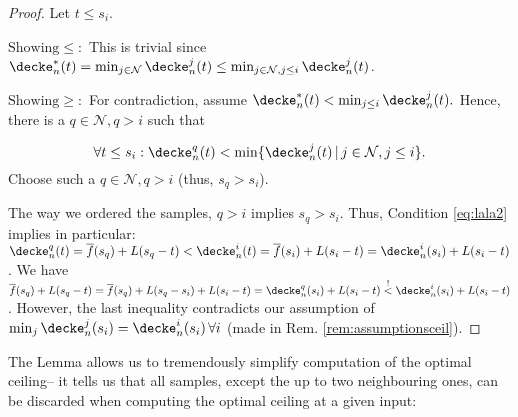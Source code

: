 \begin{lem}
\begin{proof}
Let $t \leq s_i$. 

$\text{Showing} \leq:$ This is trivial since $\decke_n^*(t) = \min_{j \in \mathcal N} \decke_n^j(t) \leq \min_{j \in \mathcal N, j \leq i}\decke_n^j(t)$. 


$\text{Showing} \geq:$ For contradiction, assume $\decke_n^* ( t) < \min_{j\leq i} \decke_n^j(t).$ 
Hence, there is a $q \in \mathcal N, q > i$ such that 

\begin{equation}
\label{eq:lala2}
\forall t \leq s_i: \decke_n^q(t) < \min\{  \decke_n^j (t) \,\vert \, j \in \mathcal N, j \leq i\}.
\end{equation}
%
Choose such a $q \in \mathcal N , q > i$ (thus, $s_q > s_i$).


The way we ordered the samples, $q>i$ implies $s_q > s_{i}$. Thus, Condition \ref{eq:lala2} implies in particular: $\decke_n^q(t) =\overline f(s_q) + L (s_q -t ) < \decke_n^i(t) = \overline f(s_{i}) + L ( s_{i} -t) = \decke_n^{i}(s_{i}) + L ( s_{i} -t)$. We have $\overline f(s_q) + L (s_q-t) = \overline f(s_q) + L (s_q - s_{i} ) + L (s_{i} - t) = \decke_n^q(s_{i}) + L (s_{i} - t) \stackrel{!}{ <} \decke_n^{i}(s_{i}) + L (s_{i} -t) $. However, the last inequality contradicts our assumption of $\min_j \decke_n^j(s_i) =\decke_n^i(s_i)\,\forall i$ (made in Rem. \ref{rem:assumptionsceil}).



\end{proof}

\end{lem}


The Lemma allows us to tremendously simplify computation of the optimal ceiling-- it tells us that all samples, except the up to two neighbouring ones, can be discarded when computing the optimal ceiling at a given input:


